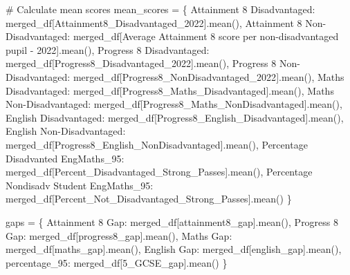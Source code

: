 \documentclass[
  letterpaper,
  DIV=11,
  numbers=noendperiod]{scrartcl}
\newenvironment{Shaded}{\begin{snugshade}}{\end{snugshade}}
\newcommand{\CommentTok}[1]{\textcolor[rgb]{0.37,0.37,0.37}{#1}}
\newcommand{\NormalTok}[1]{\textcolor[rgb]{0.00,0.23,0.31}{#1}}
\newcommand{\OperatorTok}[1]{\textcolor[rgb]{0.37,0.37,0.37}{#1}}
\newcommand{\StringTok}[1]{\textcolor[rgb]{0.13,0.47,0.30}{#1}}
\begin{document}
\begin{Shaded}
\begin{Highlighting}[]
\CommentTok{\# Calculate mean scores}
\NormalTok{mean\_scores }\OperatorTok{=}\NormalTok{ \{}
    \StringTok{\textquotesingle{}Attainment 8 Disadvantaged\textquotesingle{}}\NormalTok{: merged\_df[}\StringTok{\textquotesingle{}Attainment8\_Disadvantaged\_2022\textquotesingle{}}\NormalTok{].mean(),}
    \StringTok{\textquotesingle{}Attainment 8 Non{-}Disadvantaged\textquotesingle{}}\NormalTok{: merged\_df[}\StringTok{\textquotesingle{}Average Attainment 8 score per non{-}disadvantaged pupil  {-} 2022\textquotesingle{}}\NormalTok{].mean(),}
    \StringTok{\textquotesingle{}Progress 8 Disadvantaged\textquotesingle{}}\NormalTok{: merged\_df[}\StringTok{\textquotesingle{}Progress8\_Disadvantaged\_2022\textquotesingle{}}\NormalTok{].mean(),}
    \StringTok{\textquotesingle{}Progress 8 Non{-}Disadvantaged\textquotesingle{}}\NormalTok{: merged\_df[}\StringTok{\textquotesingle{}Progress8\_NonDisadvantaged\_2022\textquotesingle{}}\NormalTok{].mean(),}
    \StringTok{\textquotesingle{}Maths Disadvantaged\textquotesingle{}}\NormalTok{: merged\_df[}\StringTok{\textquotesingle{}Progress8\_Maths\_Disadvantaged\textquotesingle{}}\NormalTok{].mean(),}
    \StringTok{\textquotesingle{}Maths Non{-}Disadvantaged\textquotesingle{}}\NormalTok{: merged\_df[}\StringTok{\textquotesingle{}Progress8\_Maths\_NonDisadvantaged\textquotesingle{}}\NormalTok{].mean(),}
    \StringTok{\textquotesingle{}English Disadvantaged\textquotesingle{}}\NormalTok{: merged\_df[}\StringTok{\textquotesingle{}Progress8\_English\_Disadvantaged\textquotesingle{}}\NormalTok{].mean(),}
    \StringTok{\textquotesingle{}English Non{-}Disadvantaged\textquotesingle{}}\NormalTok{: merged\_df[}\StringTok{\textquotesingle{}Progress8\_English\_NonDisadvantaged\textquotesingle{}}\NormalTok{].mean(),}
    \StringTok{\textquotesingle{}Percentage Disadvanted EngMaths\_95\textquotesingle{}}\NormalTok{: merged\_df[}\StringTok{\textquotesingle{}Percent\_Disadvantaged\_Strong\_Passes\textquotesingle{}}\NormalTok{].mean(),}
    \StringTok{\textquotesingle{}Percentage Nondisadv Student EngMaths\_95\textquotesingle{}}\NormalTok{: merged\_df[}\StringTok{\textquotesingle{}Percent\_Not\_Disadvantaged\_Strong\_Passes\textquotesingle{}}\NormalTok{].mean()}
\NormalTok{\}}


\NormalTok{gaps }\OperatorTok{=}\NormalTok{ \{}
    \StringTok{\textquotesingle{}Attainment 8 Gap\textquotesingle{}}\NormalTok{: merged\_df[}\StringTok{\textquotesingle{}attainment8\_gap\textquotesingle{}}\NormalTok{].mean(),}
    \StringTok{\textquotesingle{}Progress 8 Gap\textquotesingle{}}\NormalTok{: merged\_df[}\StringTok{\textquotesingle{}progress8\_gap\textquotesingle{}}\NormalTok{].mean(), }
    \StringTok{\textquotesingle{}Maths Gap\textquotesingle{}}\NormalTok{:  merged\_df[}\StringTok{\textquotesingle{}maths\_gap\textquotesingle{}}\NormalTok{].mean(),}
    \StringTok{\textquotesingle{}English Gap\textquotesingle{}}\NormalTok{:  merged\_df[}\StringTok{\textquotesingle{}english\_gap\textquotesingle{}}\NormalTok{].mean(), }
    \StringTok{\textquotesingle{}percentage\_95\textquotesingle{}}\NormalTok{:  merged\_df[}\StringTok{\textquotesingle{}5\_GCSE\_gap\textquotesingle{}}\NormalTok{].mean() }
\NormalTok{\}}


\end{Highlighting}
\end{Shaded}
\end{document}
